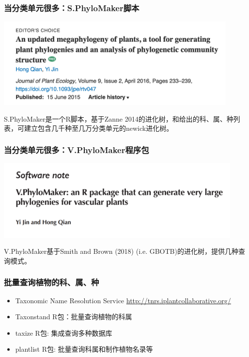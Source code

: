 \documentclass[UTF8]{ctexbeamer}
\begin{document}
    \begin{frame}
    \frametitle{当分类单元很多：S.PhyloMaker脚本}
    \begin{center}
    \includegraphics[height=1.8in]{sphylomaker.png}
    \end{center}
    S.PhyloMaker是一个R脚本，基于Zanne 2014的进化树，和给出的科、属、种列表，可建立包含几千种至几万分类单元的newick进化树。
    \end{frame}
    
    \begin{frame}
    \frametitle{当分类单元很多：V.PhyloMaker程序包}
    \begin{center}
    \includegraphics[height=1.6in]{v_phylomaker.png}
    \end{center}
    V.PhyloMaker基于Smith and Brown (2018) (i.e. GBOTB)的进化树，提供几种查询模式。
    \end{frame}

    \begin{frame}
    \frametitle{批量查询植物的科、属、种}
    \begin{itemize}
    \item Taxonomic Name Resolution Service \url{http://tnrs.iplantcollaborative.org/}
    \item Taxonstand R包：批量查询植物的科属
    \item taxize R包: 集成查询多种数据库
    \item plantlist R包: 批量查询科属和制作植物名录等
    \end{itemize}
    
    \end{frame}
    
\end{document}
